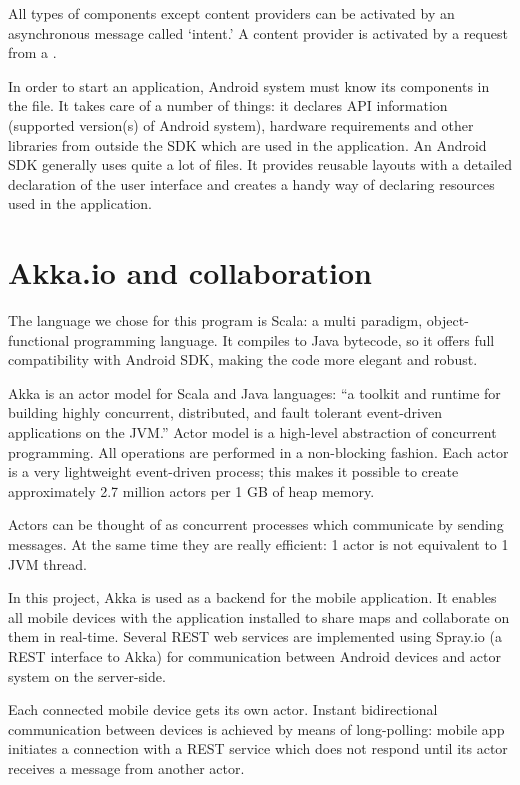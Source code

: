 All types of components except content providers can be activated by an asynchronous message called `intent.' A content provider is activated by a request from a .

In order to start an application, Android system must know its components in the  file. It takes care of a number of things: it declares API information (supported version(s) of Android system), hardware requirements and other libraries from outside the SDK which are used in the application. An Android SDK generally uses quite a lot of  files. It provides reusable layouts with a detailed declaration of the user interface and creates a handy way of declaring resources used in the application.

\section{Akka.io and collaboration}
\label{sec:akka}

The language we chose for this program is Scala: a multi paradigm, object-functional programming language. It compiles to Java bytecode, so it offers full compatibility with Android SDK, making the code more elegant and robust. \cite{Odersky:2008:Programming}

Akka is an actor model for Scala and Java languages: ``a toolkit and runtime for building highly concurrent, distributed, and fault tolerant event-driven applications on the JVM.'' Actor model is a high-level abstraction of concurrent programming. All operations are performed in a non-blocking fashion. Each actor is a very lightweight event-driven process; this makes it possible to create approximately 2.7 million actors per 1 GB of heap memory. \cite{Akka:2013:Docs}

Actors can be thought of as concurrent processes which communicate by sending messages. At the same time they are really efficient: 1 actor is not equivalent to 1 JVM thread.

In this project, Akka is used as a backend for the mobile application. It enables all mobile devices with the application installed to share maps and collaborate on them in real-time. Several REST web services are implemented using Spray.io (a REST interface to Akka) for communication between Android devices and actor system on the server-side.

Each connected mobile device gets its own actor. Instant bidirectional communication between devices is achieved by means of long-polling: mobile app initiates a connection with a REST service which does not respond until its actor receives a message from another actor.
